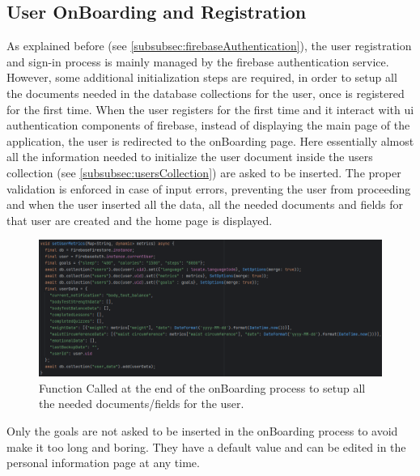 \subsection{User OnBoarding and Registration}
As explained before (see \cref{subsubsec:firebaseAuthentication}), the user registration and sign-in process is mainly managed by the firebase authentication service. However, some additional initialization steps are required, in order to setup all the documents needed in the database collections for the user, once is registered for the first time. When the user registers for the first time and it interact with ui authentication components of firebase, instead of displaying the main page of the application, the user is redirected to the onBoarding page. Here essentially almost all the information needed to initialize the user document inside the users collection (see \cref{subsubsec:usersCollection}) are asked to be inserted. The proper validation is enforced in case of input errors, preventing the user from proceeding and when the user inserted all the data, all the needed documents and fields for that user are created and the home page is displayed. 
\clearpage
\begin{figure}
    \includegraphics[width=1.0\linewidth]{./images/onBoarding.png}
    \caption{Function Called at the end of the onBoarding process to setup all the needed documents/fields for the user.}
\end{figure}

\noindent Only the goals are not asked to be inserted in the onBoarding process to avoid make it too long and boring. They have a default value and can be edited in the personal information page at any time.
